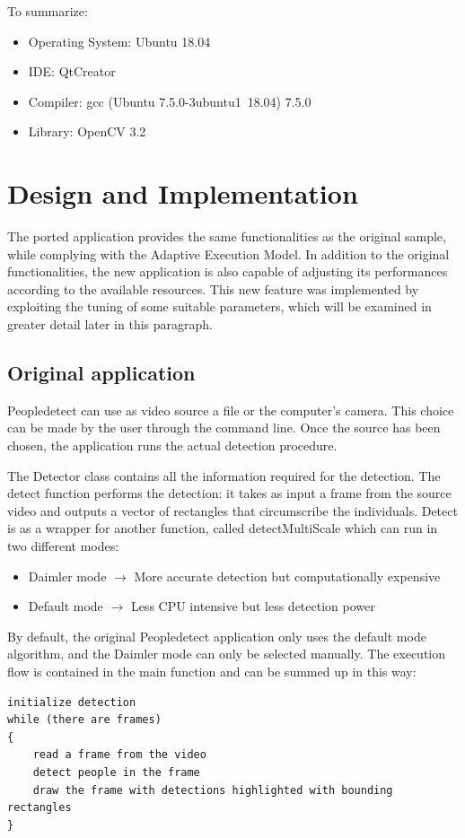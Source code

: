 To summarize:
\begin{itemize}
\item Operating System: Ubuntu 18.04
\item IDE: QtCreator
\item Compiler: gcc (Ubuntu 7.5.0-3ubuntu1~18.04) 7.5.0
\item Library: OpenCV 3.2
\end{itemize}


\section{Design and Implementation}
The ported application provides the same functionalities as the
original sample, while complying with the Adaptive Execution Model.
In addition to the original functionalities, the new application is
also capable of adjusting its performances according to the
available resources. This new feature was implemented by exploiting
the tuning of some suitable parameters, which will be examined in
greater detail later in this paragraph.

\subsection{Original application}
Peopledetect can use as video source a
file or the computer's camera. This choice can be made by the user
through the command line. Once the source has been chosen, the
application runs the actual detection procedure.

The Detector class contains all the information required for the
detection. The detect function performs the
detection: it takes as input a frame from the source video and
outputs a vector of rectangles that circumscribe the individuals.
Detect is as a wrapper for another function, called
detectMultiScale which can run in two different modes:
\begin{itemize}
\item Daimler mode $\rightarrow$ More accurate detection but computationally expensive
\item Default mode $\rightarrow$ Less CPU intensive but less detection power
\end{itemize}

By default, the original Peopledetect application only uses the
default mode algorithm, and the Daimler mode can only be selected
manually.
The execution flow is contained in the main function and can be
summed up in this way:
\begin{verbatim}
initialize detection
while (there are frames)
{
    read a frame from the video
    detect people in the frame
    draw the frame with detections highlighted with bounding rectangles
}
\end{verbatim}

